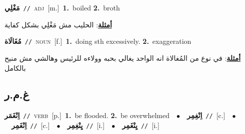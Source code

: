 \documentclass[10pt,a4paper,twoside]{article} %
\begin{document}
\begin{multicols}{2}
{\setlength\topsep{0pt}\textbf{\foreignlanguage{arabic}{مَغْلِي}}\ {\color{gray}\texttt{//}\color{black}}\ \textsc{adj}\ [m.]\ \textbf{1.}~boiled  \textbf{2.}~broth\  \begin{flushright}\color{gray}\foreignlanguage{arabic}{\textbf{\underline{\foreignlanguage{arabic}{أمثلة}}}: الحليب مش مَغْلِي بشكل كفاية}\end{flushright}\color{black}} \vspace{2mm}

{\setlength\topsep{0pt}\textbf{\foreignlanguage{arabic}{مُغَالَاة}}\ {\color{gray}\texttt{//}\color{black}}\ \textsc{noun}\ [f.]\ \textbf{1.}~doing sth  excessively.  \textbf{2.}~exaggeration\  \begin{flushright}\color{gray}\foreignlanguage{arabic}{\textbf{\underline{\foreignlanguage{arabic}{أمثلة}}}: في نوع من المُغالاة انه الواحد يغالي بحبه وولاءه للرئيس وهالشي مش منيح بالكامل}\end{flushright}\color{black}} \vspace{2mm}

\vspace{-3mm}
\subsection*{\color{blue}\foreignlanguage{arabic}{غ.م.ر}\color{blue}{}} 

{\setlength\topsep{0pt}\textbf{\foreignlanguage{arabic}{اِنْغَمَر}}\ {\color{gray}\texttt{//}\color{black}}\ \textsc{verb}\ [p.]\ \textbf{1.}~be flooded.  \textbf{2.}~be overwhelmed\ \ $\bullet$\ \ \setlength\topsep{0pt}\textbf{\foreignlanguage{arabic}{اِنْغِمِر}}\ {\color{gray}\texttt{//}\color{black}}\ [c.]\ \ $\bullet$\ \ \setlength\topsep{0pt}\textbf{\foreignlanguage{arabic}{اِنْغَمِر}}\ {\color{gray}\texttt{//}\color{black}}\ [c.]\ \ $\bullet$\ \ \setlength\topsep{0pt}\textbf{\foreignlanguage{arabic}{يِنْغِمِر}}\ {\color{gray}\texttt{//}\color{black}}\ [i.]\ \ $\bullet$\ \ \setlength\topsep{0pt}\textbf{\foreignlanguage{arabic}{يِنْغَمِر}}\ {\color{gray}\texttt{//}\color{black}}\ [i.]\ } \vspace{2mm}


\end{multicols}
\end{document}
